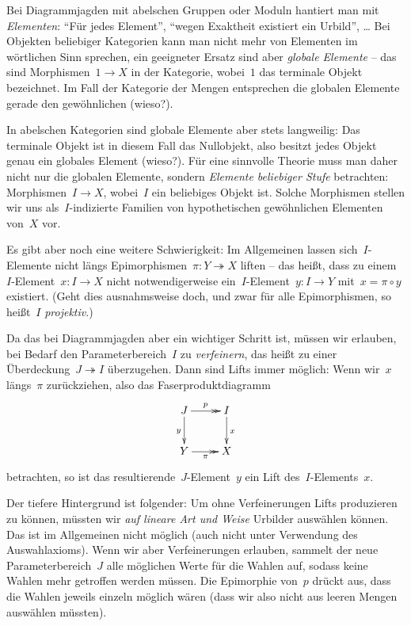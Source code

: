 \documentclass{uebblatt}
\begin{document}

Bei Diagrammjagden mit abelschen Gruppen oder Moduln hantiert man mit
\emph{Elementen}: "`Für jedes Element"', "`wegen Exaktheit existiert ein
Urbild"', \ldots{} Bei Objekten beliebiger Kategorien kann man nicht mehr von
Elementen im wörtlichen Sinn sprechen, ein geeigneter Ersatz sind aber
\emph{globale Elemente} -- das sind Morphismen~$1 \to X$ in der Kategorie,
wobei~$1$ das terminale Objekt bezeichnet. Im Fall der Kategorie der Mengen
entsprechen die globalen Elemente gerade den gewöhnlichen (wieso?).

In abelschen Kategorien sind globale Elemente aber stets langweilig: Das
terminale Objekt ist in diesem Fall das Nullobjekt, also besitzt jedes Objekt
genau ein globales Element (wieso?). Für eine sinnvolle Theorie muss man daher
nicht nur die globalen Elemente, sondern \emph{Elemente beliebiger Stufe}
betrachten: Morphismen~$I \to X$, wobei~$I$ ein beliebiges Objekt ist. Solche
Morphismen stellen wir uns als~$I$-indizierte Familien von hypothetischen
gewöhnlichen Elementen von~$X$ vor.

Es gibt aber noch eine weitere Schwierigkeit: Im Allgemeinen lassen
sich~$I$-Elemente nicht längs Epimorphismen~$\pi : Y \twoheadrightarrow X$
liften -- das heißt, dass zu einem~$I$-Element~$x : I \to X$
nicht notwendigerweise ein~$I$-Element~$y : I \to Y$ mit~$x = \pi \circ y$
existiert. (Geht dies ausnahmsweise doch, und zwar für alle Epimorphismen, so
heißt~$I$ \emph{projektiv}.)

Da das bei Diagrammjagden aber ein wichtiger Schritt ist, müssen wir erlauben,
bei Bedarf den Parameterbereich~$I$ zu \emph{verfeinern}, das heißt zu einer
Überdeckung~$J \twoheadrightarrow I$ überzugehen. Dann sind Lifts immer
möglich: Wenn wir~$x$ längs~$\pi$ zurückziehen, also das
Faserproduktdiagramm
\[ \xymatrix{
  J \ar@{->>}[r]^p \ar[d]_y & I \ar[d]^x \\
  Y \ar@{->>}[r]_\pi & X
} \]
betrachten, so ist das resultierende~$J$-Element~$y$ ein Lift
des~$I$-Elements~$x$.

Der tiefere Hintergrund ist folgender: Um ohne Verfeinerungen
Lifts produzieren zu können, müssten wir \emph{auf lineare Art und Weise}
Urbilder auswählen können. Das ist im Allgemeinen nicht möglich (auch nicht
unter Verwendung des Auswahlaxioms). Wenn wir aber Verfeinerungen erlauben,
sammelt der neue Parameterbereich~$J$ alle möglichen Werte für die Wahlen auf,
sodass keine Wahlen mehr getroffen werden müssen. Die Epimorphie von~$p$ drückt
aus, dass die Wahlen jeweils einzeln möglich wären (dass wir also nicht aus
leeren Mengen auswählen müssten).
\end{document}
